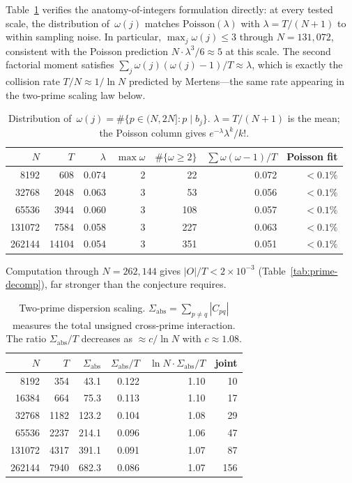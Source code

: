 \documentclass[11pt]{article}
\theoremstyle{definition}
\theoremstyle{remark}
\begin{document}
\noindent
Table~\ref{tab:omega-dist} verifies the
anatomy-of-integers formulation directly:
at every tested scale, the distribution
of~$\omega(j)$ matches
$\mathrm{Poisson}(\lambda)$ with
$\lambda = T/(N{+}1)$
to within sampling noise.
In particular, $\max_j \omega(j) \le 3$
through $N = 131{,}072$, consistent with
the Poisson prediction
$N \cdot \lambda^3\!/6 \approx 5$
at this scale.
The second factorial moment satisfies
$\sum_j \omega(j)(\omega(j){-}1)/T
\approx \lambda$,
which is exactly the collision rate
$T/N \approx 1/\!\ln N$ predicted by
Mertens---the same rate appearing in
the two-prime scaling law below.

\begin{table}[ht]
\centering\small
\caption{Distribution of~$\omega(j)
= \#\{p \in (N,2N] : p \mid b_j\}$.
$\lambda = T/(N{+}1)$ is the mean;
the Poisson column gives
$e^{-\lambda}\lambda^k/k!$.}
\label{tab:omega-dist}
\begin{tabular}{rrrrrrr}
\toprule
$N$ & $T$ & $\lambda$ &
$\max\omega$ &
$\#\{\omega{\ge}2\}$ &
$\sum\omega(\omega{-}1)/T$ &
Poisson fit \\
\midrule
8192 & 608 & 0.074
& 2 & 22 & 0.072
& $<0.1\%$ \\
32768 & 2048 & 0.063
& 3 & 53 & 0.056
& $<0.1\%$ \\
65536 & 3944 & 0.060
& 3 & 108 & 0.057
& $<0.1\%$ \\
131072 & 7584 & 0.058
& 3 & 227 & 0.063
& $<0.1\%$ \\
262144 & 14104 & 0.054
& 3 & 351 & 0.051
& $<0.1\%$ \\
\bottomrule
\end{tabular}
\end{table}

\noindent
Computation through $N = 262{,}144$
gives $|O|/T < 2 \times 10^{-3}$
(Table~\ref{tab:prime-decomp}),
far stronger than the
conjecture requires.

\begin{table}[ht]
\centering\small
\caption{Two-prime dispersion scaling.
$\Sigma_{\mathrm{abs}} =
\sum_{p \ne q} |C_{pq}|$
measures the total unsigned
cross-prime interaction.
The ratio
$\Sigma_{\mathrm{abs}}/T$
decreases as $\approx c/\ln N$
with $c \approx 1.08$.}
\label{tab:two-prime-scaling}
\begin{tabular}{rrrrrr}
\toprule
$N$ & $T$ &
$\Sigma_{\mathrm{abs}}$ &
$\Sigma_{\mathrm{abs}}/T$ &
$\ln N \cdot \Sigma_{\mathrm{abs}}/T$ &
joint \\
\midrule
8192 & 354 & 43.1 & 0.122 & 1.10 & 10 \\
16384 & 664 & 75.3 & 0.113 & 1.10 & 17 \\
32768 & 1182 & 123.2 & 0.104 & 1.08 & 29 \\
65536 & 2237 & 214.1 & 0.096 & 1.06 & 47 \\
131072 & 4317 & 391.1 & 0.091 & 1.07 & 87 \\
262144 & 7940 & 682.3 & 0.086 & 1.07 & 156 \\
\bottomrule
\end{tabular}
\end{table}
\end{document}
